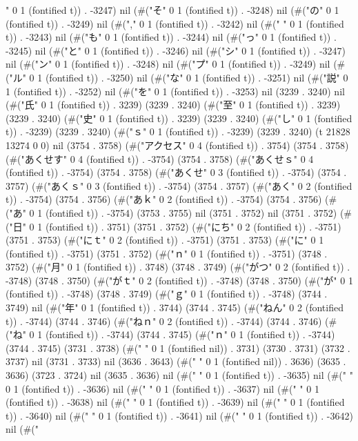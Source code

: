 " 0 1 (fontified t)) . -3247) nil (#("そ" 0 1 (fontified t)) . -3248) nil (#("の" 0 1 (fontified t)) . -3249) nil (#("," 0 1 (fontified t)) . -3242) nil (#(" " 0 1 (fontified t)) . -3243) nil (#("も" 0 1 (fontified t)) . -3244) nil (#("っ" 0 1 (fontified t)) . -3245) nil (#("と" 0 1 (fontified t)) . -3246) nil (#("シ" 0 1 (fontified t)) . -3247) nil (#("ン" 0 1 (fontified t)) . -3248) nil (#("プ" 0 1 (fontified t)) . -3249) nil (#("ル" 0 1 (fontified t)) . -3250) nil (#("な" 0 1 (fontified t)) . -3251) nil (#("説" 0 1 (fontified t)) . -3252) nil (#("を" 0 1 (fontified t)) . -3253) nil (3239 . 3240) nil (#("氏" 0 1 (fontified t)) . 3239) (3239 . 3240) (#("至" 0 1 (fontified t)) . 3239) (3239 . 3240) (#("史" 0 1 (fontified t)) . 3239) (3239 . 3240) (#("し" 0 1 (fontified t)) . -3239) (3239 . 3240) (#("ｓ" 0 1 (fontified t)) . -3239) (3239 . 3240) (t 21828 13274 0 0) nil (3754 . 3758) (#("アクセス" 0 4 (fontified t)) . 3754) (3754 . 3758) (#("あくせす" 0 4 (fontified t)) . -3754) (3754 . 3758) (#("あくせｓ" 0 4 (fontified t)) . -3754) (3754 . 3758) (#("あくせ" 0 3 (fontified t)) . -3754) (3754 . 3757) (#("あくｓ" 0 3 (fontified t)) . -3754) (3754 . 3757) (#("あく" 0 2 (fontified t)) . -3754) (3754 . 3756) (#("あｋ" 0 2 (fontified t)) . -3754) (3754 . 3756) (#("あ" 0 1 (fontified t)) . -3754) (3753 . 3755) nil (3751 . 3752) nil (3751 . 3752) (#("日" 0 1 (fontified t)) . 3751) (3751 . 3752) (#("にち" 0 2 (fontified t)) . -3751) (3751 . 3753) (#("にｔ" 0 2 (fontified t)) . -3751) (3751 . 3753) (#("に" 0 1 (fontified t)) . -3751) (3751 . 3752) (#("ｎ" 0 1 (fontified t)) . -3751) (3748 . 3752) (#("月" 0 1 (fontified t)) . 3748) (3748 . 3749) (#("がつ" 0 2 (fontified t)) . -3748) (3748 . 3750) (#("がｔ" 0 2 (fontified t)) . -3748) (3748 . 3750) (#("が" 0 1 (fontified t)) . -3748) (3748 . 3749) (#("ｇ" 0 1 (fontified t)) . -3748) (3744 . 3749) nil (#("年" 0 1 (fontified t)) . 3744) (3744 . 3745) (#("ねん" 0 2 (fontified t)) . -3744) (3744 . 3746) (#("ねｎ" 0 2 (fontified t)) . -3744) (3744 . 3746) (#("ね" 0 1 (fontified t)) . -3744) (3744 . 3745) (#("ｎ" 0 1 (fontified t)) . -3744) (3744 . 3745) (3731 . 3738) (#(" " 0 1 (fontified nil)) . 3731) (3730 . 3731) (3732 . 3737) nil (3731 . 3733) nil (3636 . 3643) (#(" " 0 1 (fontified nil)) . 3636) (3635 . 3636) (3723 . 3724) nil (3635 . 3636) nil (#("
" 0 1 (fontified t)) . -3635) nil (#(" " 0 1 (fontified t)) . -3636) nil (#(" " 0 1 (fontified t)) . -3637) nil (#(" " 0 1 (fontified t)) . -3638) nil (#(" " 0 1 (fontified t)) . -3639) nil (#(" " 0 1 (fontified t)) . -3640) nil (#(" " 0 1 (fontified t)) . -3641) nil (#(" " 0 1 (fontified t)) . -3642) nil (#("
